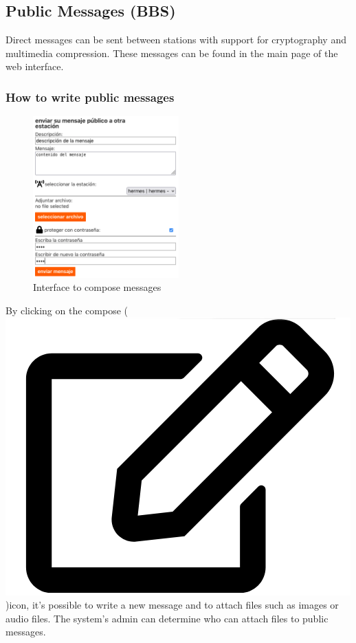 \documentclass[11pt,a4paper]{article}
\begin{document}
\subsection{Public Messages  (BBS)}

Direct messages can be sent between stations with support for cryptography and  multimedia compression. These messages can be found in the main page of the web interface.

\subsubsection{How to write public messages}


\begin{figure}[H]
    \centering
    \includegraphics[width=0.5\textwidth]{screenshots/frontend/es_old/messagecompose.png}
    \caption{Interface to compose messages}
    \label{fig:compose}
\end{figure}

By clicking on the compose (\includegraphics[height=0.8\baselineskip]{pictures/edit.png})icon, it's possible to write a new message and to attach files such as images or audio files. The system's admin can determine who can attach files to public messages. 
\end{document}
